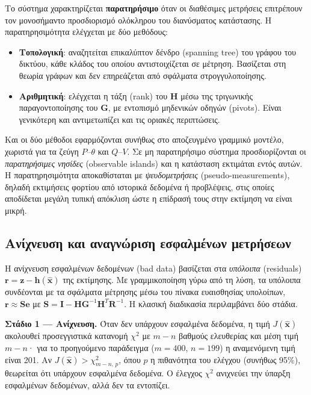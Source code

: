Το σύστημα χαρακτηρίζεται \textbf{παρατηρήσιμο} όταν οι διαθέσιμες μετρήσεις επιτρέπουν τον
μονοσήμαντο προσδιορισμό ολόκληρου του διανύσματος κατάστασης. Η παρατηρησιμότητα ελέγχεται
με δύο μεθόδους:

\begin{itemize}
\item \textbf{Τοπολογική}: αναζητείται επικαλύπτον δένδρο (spanning tree) του γράφου του
      δικτύου, κάθε κλάδος του οποίου αντιστοιχίζεται σε μέτρηση. Βασίζεται στη θεωρία
      γράφων και δεν επηρεάζεται από σφάλματα στρογγυλοποίησης.
\item \textbf{Αριθμητική}: ελέγχεται η τάξη (rank) του $\mathbf{H}$ μέσω της τριγωνικής
      παραγοντοποίησης του $\mathbf{G}$, με εντοπισμό μηδενικών οδηγών (pivots). Είναι
      γενικότερη και αντιμετωπίζει και τις οριακές περιπτώσεις.
\end{itemize}

Και οι δύο μέθοδοι εφαρμόζονται συνήθως στο αποζευγμένο γραμμικό μοντέλο, χωριστά για τα
ζεύγη $P$--$\theta$ και $Q$--$V$. Σε μη παρατηρήσιμο σύστημα προσδιορίζονται οι
\emph{παρατηρήσιμες νησίδες} (observable islands) και η κατάσταση εκτιμάται εντός αυτών. Η
παρατηρησιμότητα αποκαθίσταται με \emph{ψευδομετρήσεις} (pseudo-measurements), δηλαδή
εκτιμήσεις φορτίου από ιστορικά δεδομένα ή προβλέψεις, στις οποίες αποδίδεται μεγάλη τυπική
απόκλιση ώστε η επίδρασή τους στην εκτίμηση να είναι μικρή.

\subsection{Ανίχνευση και αναγνώριση εσφαλμένων μετρήσεων}

Η ανίχνευση εσφαλμένων δεδομένων (bad data) βασίζεται στα \emph{υπόλοιπα} (residuals)
$\mathbf{r} = \mathbf{z}-\mathbf{h}(\hat{\mathbf{x}})$ της εκτίμησης. Με γραμμικοποίηση γύρω από
τη λύση, τα υπόλοιπα συνδέονται με τα σφάλματα μέτρησης μέσω του πίνακα ευαισθησίας
υπολοίπων, $\mathbf{r} \approx \mathbf{S}\mathbf{e}$ με
$\mathbf{S} = \mathbf{I} - \mathbf{H}\mathbf{G}^{-1}\mathbf{H}^{T}\mathbf{R}^{-1}$. Η κλασική
διαδικασία περιλαμβάνει δύο στάδια.

\textbf{Στάδιο 1 --- Ανίχνευση.} Όταν δεν υπάρχουν εσφαλμένα δεδομένα, η τιμή
$J(\hat{\mathbf{x}})$ ακολουθεί προσεγγιστικά κατανομή $\chi^2$ με $m-n$ βαθμούς ελευθερίας
και μέση τιμή $m-n$· για το προηγούμενο παράδειγμα ($m = 400$, $n = 199$) η αναμενόμενη τιμή
είναι 201. Αν $J(\hat{\mathbf{x}}) > \chi^2_{m-n,\,p}$, όπου $p$ η πιθανότητα του ελέγχου
(συνήθως 95\%), θεωρείται ότι υπάρχουν εσφαλμένα δεδομένα. Ο έλεγχος $\chi^2$ ανιχνεύει την
ύπαρξη εσφαλμένων δεδομένων, αλλά δεν τα εντοπίζει.


